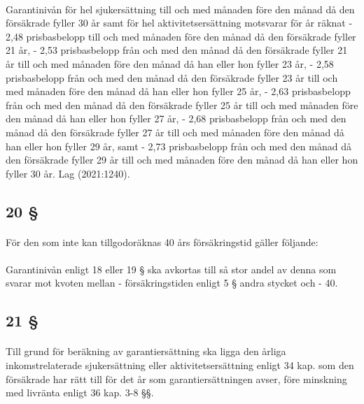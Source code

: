\documentclass[a4paper,notitlepage,openany,10pt]{book}
\begin{document}
\paragraph*{}
Garantinivån för hel sjukersättning till och med månaden före den månad då den försäkrade fyller 30 år samt för hel aktivitetsersättning motsvarar för år räknat
\newline - 2,48 prisbasbelopp till och med månaden före den månad då den försäkrade fyller 21 år,
\newline - 2,53 prisbasbelopp från och med den månad då den försäkrade fyller 21 år till och med månaden före den månad då han eller hon fyller 23 år,
\newline - 2,58 prisbasbelopp från och med den månad då den försäkrade fyller 23 år till och med månaden före den månad då han eller hon fyller 25 år,
\newline - 2,63 prisbasbelopp från och med den månad då den försäkrade fyller 25 år till och med månaden före den månad då han eller hon fyller 27 år,
\newline - 2,68 prisbasbelopp från och med den månad då den försäkrade fyller 27 år till och med månaden före den månad då han eller hon fyller 29 år, samt
\newline - 2,73 prisbasbelopp från och med den månad då den försäkrade fyller 29 år till och med månaden före den månad då han eller hon fyller 30 år.
Lag (2021:1240).
\subsection*{20 §}
\paragraph*{}
För den som inte kan tillgodoräknas 40 års försäkringstid gäller följande:
\paragraph*{}
Garantinivån enligt 18 eller 19 § ska avkortas till så stor andel av denna som svarar mot kvoten mellan - försäkringstiden enligt 5 § andra stycket och
\newline - 40.
\subsection*{21 §}
\paragraph*{}
Till grund för beräkning av garantiersättning ska ligga den årliga inkomstrelaterade sjukersättning eller aktivitetsersättning enligt 34 kap. som den försäkrade har rätt till för det år som garantiersättningen avser, före minskning med livränta enligt 36 kap. 3-8 §§.
\end{document}
